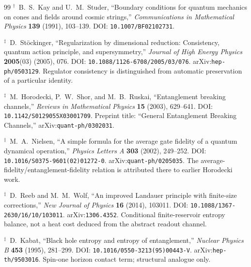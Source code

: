 \documentclass[11pt,a4paper]{article}
\theoremstyle{plain}
\theoremstyle{definition}
\theoremstyle{remark}
\numberwithin{equation}{section}
\begin{document}
\begin{thebibliography}{99}
\(^{\dagger}\)\ B.~S.~Kay and U.~M.~Studer,
``Boundary conditions for quantum mechanics on cones and fields
around cosmic strings,''
\emph{Communications in Mathematical Physics}
\textbf{139} (1991), 103--139.
DOI: \nolinkurl{10.1007/BF02102731}.

\(^{\ddagger}\)\ D.~St\"ockinger,
``Regularization by dimensional reduction:
Consistency, quantum action principle, and supersymmetry,''
\emph{Journal of High Energy Physics}
\textbf{2005}(03) (2005), 076.
DOI: \nolinkurl{10.1088/1126-6708/2005/03/076}.
arXiv:\nolinkurl{hep-ph/0503129}.
Regulator consistency is distinguished from automatic preservation
of a particular identity.

\(^{\ddagger}\)\ M.~Horodecki, P.~W.~Shor, and M.~B.~Ruskai,
``Entanglement breaking channels,''
\emph{Reviews in Mathematical Physics}
\textbf{15} (2003), 629--641.
DOI: \nolinkurl{10.1142/S0129055X03001709}.
Preprint title:
``General Entanglement Breaking Channels,''
arXiv:\nolinkurl{quant-ph/0302031}.

\(^{\ddagger}\)\ M.~A.~Nielsen,
``A simple formula for the average gate fidelity of a quantum
dynamical operation,''
\emph{Physics Letters A}
\textbf{303} (2002), 249--252.
DOI: \nolinkurl{10.1016/S0375-9601(02)01272-0}.
arXiv:\nolinkurl{quant-ph/0205035}.
The average-fidelity/entanglement-fidelity relation is attributed
there to earlier Horodecki work.

\(^{\ddagger}\)\ D.~Reeb and M.~M.~Wolf,
``An improved Landauer principle with finite-size corrections,''
\emph{New Journal of Physics}
\textbf{16} (2014), 103011.
DOI: \nolinkurl{10.1088/1367-2630/16/10/103011}.
arXiv:\nolinkurl{1306.4352}.
Conditional finite-reservoir entropy balance, not a heat cost
deduced from the abstract readout channel.

\(^{\ddagger}\)\ D.~Kabat,
``Black hole entropy and entropy of entanglement,''
\emph{Nuclear Physics B} \textbf{453} (1995), 281--299.
DOI: \nolinkurl{10.1016/0550-3213(95)00443-V}.
arXiv:\nolinkurl{hep-th/9503016}.
Spin-one horizon contact term; structural analogue only.

\end{thebibliography}
\end{document}

